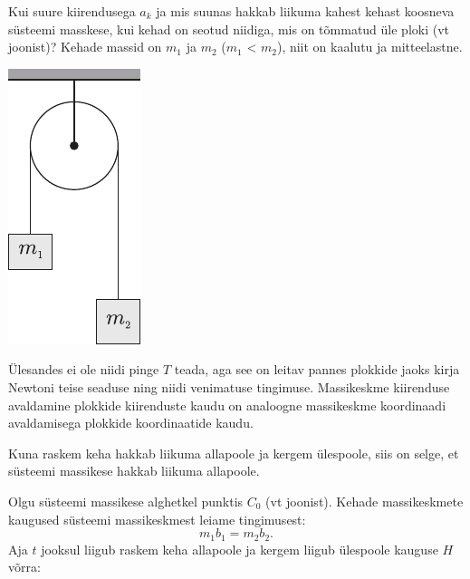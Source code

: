 
Kui suure kiirendusega $a_k$ ja mis suunas hakkab liikuma kahest kehast koosneva süsteemi masskese, kui kehad on seotud niidiga, mis on tõmmatud üle ploki (vt joonist)? Kehade massid on $m_1$ ja $m_2$ ($m_1$ < $m_2$), niit on kaalutu ja mitteelastne.
\begin{center}
	\includegraphics[width=0.25\linewidth]{2006-lahg-05-yl}
\end{center}

\hint
Ülesandes ei ole niidi pinge $T$ teada, aga see on leitav pannes plokkide jaoks kirja Newtoni teise seaduse ning niidi venimatuse tingimuse. Massikeskme kiirenduse avaldamine plokkide kiirenduste kaudu on analoogne massikeskme koordinaadi avaldamisega plokkide koordinaatide kaudu.

\solu
Kuna raskem keha hakkab liikuma allapoole ja kergem ülespoole, siis on selge, et süsteemi massikese hakkab liikuma allapoole. 

Olgu süsteemi massikese alghetkel punktis $C_0$ (vt joonist). Kehade massikeskmete kaugused süsteemi massikeskmest leiame tingimusest: 
\begin{equation} \label{2006-lahg-05:eq1}
m_1b_1 = m_2b_2.
\end{equation}
Aja $t$ jooksul liigub raskem keha allapoole ja kergem liigub ülespoole kauguse $H$ võrra:

